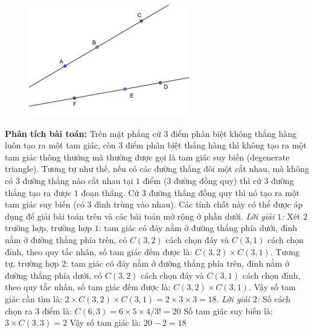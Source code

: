 \begin{multicols}{2}
		\begin{figure}[H]
			\centering
			\vspace*{-5pt}
			\captionsetup{labelformat=empty, justification=centering}
			\includegraphics[width=0.75\linewidth]{_9}
			\vspace*{-15pt}
		\end{figure}
	\vskip 0.1cm
	\textbf{\color{toancuabi}Phân tích bài toán:}
	\vskip 0.1cm
	Trên mặt phẳng cứ $3$ điểm phân biệt không thẳng hàng luôn tạo ra một tam giác, còn $3$ điểm phân biệt thẳng hàng thì không tạo ra một tam giác thông thưởng mà thường được gọi là tam giác suy biến (degenerate triangle). Tương tự như thế, nếu có các đường thẳng đôi một cắt nhau, mà không có $3$ đường thẳng nào cắt nhau tại $1$ điểm ($3$ đường đồng quy) thì cứ $3$ đường thẳng tạo ra được $1$ đoạn thẳng. Cứ $3$ đường thẳng đồng quy thì nó tạo ra một tam giác suy biến (có $3$ đỉnh trùng vào nhau). Các tính chất này có thể được áp dụng để giải bài toán trên và các bài toán mở rộng ở phần dưới.
	\vskip 0.1cm
	\textit{Lời giải $1$:}
	\vskip 0.1cm
	Xét $2$ trường hợp, trường hợp $1$: tam giác có đáy nằm ở đường thẳng phía dưới, đỉnh nằm ở đường thẳng phía trên, có $C(3,2)$ cách chọn đáy và $C(3,1)$ cách chọn đỉnh, theo quy tắc nhân, số tam giác đếm được là: $C(3,2)\times C(3,1)$. Tương tự, trường hợp $2$: tam giác có đáy nằm ở đường thẳng phía trên, đỉnh nằm ở đường thẳng phía dưới, có $C(3,2)$ cách chọn đáy và $C(3,1)$ cách chọn đỉnh, theo quy tắc nhân, số tam giác đếm được là: $C(3,2)\times C(3,1)$.
	\vskip 0.1cm
	Vậy số tam giác cần tìm là: $2\times C(3,2)\times C(3,1) = 2\times3\times3=18$.
	\vskip 0.1cm
	\textit{Lời giải $2$:}
	\vskip 0.1cm
	Số cách chọn ra $3$ điểm là: $C(6,3)=6\times 5\times4/3!=20$
	\vskip 0.1cm
	Số tam giác suy biến là: $3\times C(3,3)=2$
	\vskip 0.1cm
	Vậy số tam giác là: $20-2=18$

\end{multicols}

